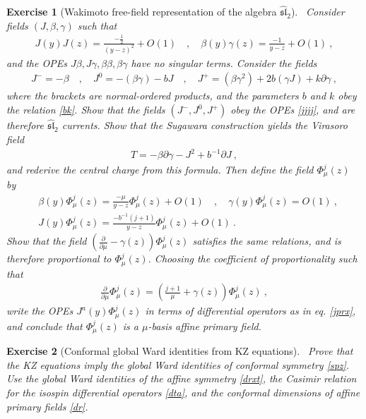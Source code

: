 \documentclass[12pt, a4paper, notitlepage, twoside]{report}
\numberwithin{equation}{section}
\theoremstyle{break}
\newtheorem{exo}{Exercise}[chapter]
\begin{document}
\begin{exo}[Wakimoto free-field representation of the algebra $\widehat{\mathfrak{sl}}_2$]
 ~\label{exowaki}
Consider fields $(J,\beta,\gamma)$ such that 
\begin{align}
 J(y)J(z) = \frac{-\frac12}{(y-z)^2} + O(1) \quad , \quad \beta(y)\gamma(z) = \frac{-1}{y-z} + O(1)\ ,
\end{align}
and the OPEs $J\beta,J\gamma,\beta\beta,\beta\gamma$ have no singular terms.
Consider the fields 
\begin{align}
 J^- = -\beta \quad , \quad J^0 = -(\beta\gamma) - bJ \quad , \quad J^+ = (\beta\gamma^2)+2b(\gamma J)+k\partial\gamma\ ,
\end{align}
where the brackets are normal-ordered products, and the parameters $b$ and $k$ obey the relation \eqref{bk}.
Show that the fields $(J^-,J^0,J^+)$ obey the OPEs \eqref{jjjj}, and are therefore $\widehat{\mathfrak{sl}}_2$ currents. 
Show that the Sugawara construction yields the Virasoro field
\begin{align}
 T = -\beta \partial\gamma - J^2 +b^{-1}\partial J\ ,
\end{align}
and rederive the central charge from this formula.
Then define the field $\Phi^j_\mu(z)$ by 
\begin{align}
 & \beta(y)\Phi^j_\mu(z) = \frac{-\mu}{y-z}\Phi^j_\mu(z)+ O(1) \quad , \quad \gamma(y)\Phi^j_\mu(z)=O(1)\ , 
\\
 & J(y)\Phi^j_\mu(z) = \frac{-b^{-1}(j+1)}{y-z}\Phi^j_\mu(z)+ O(1)\ .
\end{align}
Show that the field $\left({\frac{\partial}{\partial \mu}}-\gamma(z)\right)\Phi^j_\mu(z)$ satisfies the same relations, and is therefore proportional to $\Phi^j_\mu(z)$.
Choosing the coefficient of proportionality such that
\begin{align}
 {\frac{\partial}{\partial \mu}}\Phi^j_\mu(z) =\left(\frac{j+1}{\mu}+\gamma(z)\right)\Phi^j_\mu(z)\ ,
\end{align}
write the OPEs $J^a(y)\Phi^j_\mu(z)$ in terms of differential operators as in eq. \eqref{jprx}, and conclude that $\Phi^j_\mu(z)$ is a $\mu$-basis affine primary field.
\end{exo}

\begin{exo}[Conformal global Ward identities from KZ equations]
 ~\label{exokz}
 Prove that the KZ equations imply the global Ward identities of conformal symmetry \eqref{spz}.
 Use the global Ward identities of the affine symmetry \eqref{drxt}, the Casimir relation for the isospin differential operators \eqref{dta}, and the conformal dimensions of affine primary fields \eqref{dr}. 
\end{exo}
\end{document}
